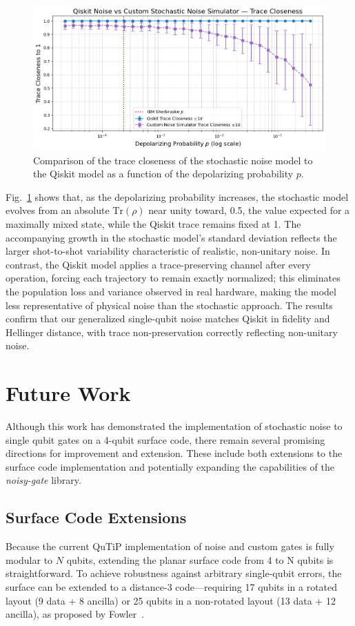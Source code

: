 \documentclass[9pt,a4paper,twocolumn,twoside]{tau-class/tau}
\begin{document}
\begin{figure}[H]
    \centering
        \includegraphics[width=1\linewidth]{figures/Trace_Qiskit_Qutip.png}
    \caption{Comparison of the trace closeness of the stochastic noise model to the Qiskit model as a function of the depolarizing probability \( p \).}
    \label{fig:trace_comparison}
\end{figure}

Fig.~\ref{fig:trace_comparison} shows that, as the depolarizing probability increases, the stochastic model evolves from an absolute \(\mathrm{Tr}(\rho)\) near unity toward, 0.5, the value expected for a maximally mixed state, while the Qiskit trace remains fixed at 1.  The accompanying growth in the stochastic model’s standard deviation reflects the larger shot-to-shot variability characteristic of realistic, non-unitary noise. In contrast, the Qiskit model applies a trace-preserving channel after every operation, forcing each trajectory to remain exactly normalized; this eliminates the population loss and variance observed in real hardware, making the model less representative of physical noise than the stochastic approach.
The results confirm that our generalized single-qubit noise matches Qiskit in fidelity and Hellinger distance, with trace non-preservation correctly reflecting non-unitary noise.

\section{Future Work}
Although this work has demonstrated the implementation of stochastic noise to single qubit gates on a 4-qubit surface code, there remain several promising directions for improvement and extension. These include both extensions to the surface code implementation and potentially expanding the capabilities of the \textit{noisy-gate} library.

\subsection*{Surface Code Extensions}
Because the current QuTiP implementation of noise and custom gates is fully modular to \(N\) qubits, extending the planar surface code from 4 to N qubits is straightforward. To achieve robustness against arbitrary single-qubit errors, the surface can be extended to a distance-3 code—requiring 17 qubits in a rotated layout (9 data + 8 ancilla) or 25 qubits in a non-rotated layout (13 data + 12 ancilla), as proposed by Fowler~\cite{fowler2012surface, fowler2014scalable}.
\end{document}
